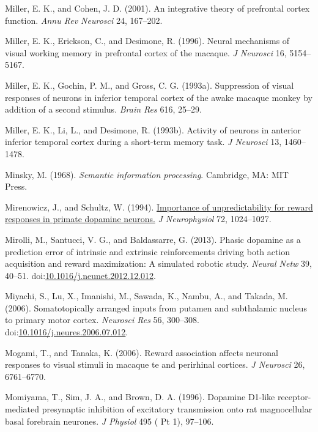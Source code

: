 \documentclass[
  11pt,
  a4paper,
]{scrbook}
\newlength{\cslhangindent}
\newenvironment{CSLReferences}[2] %
 {\begin{list}{}{%
  \setlength{\itemindent}{0pt}
  \setlength{\leftmargin}{0pt}
  \setlength{\parsep}{0pt}
  \ifodd #1
   \setlength{\leftmargin}{\cslhangindent}
   \setlength{\itemindent}{-1\cslhangindent}
  \fi
  \setlength{\itemsep}{#2\baselineskip}}}
 {\end{list}}
\begin{document}
\begin{CSLReferences}{1}{1}
Miller, E. K., and Cohen, J. D. (2001). An integrative theory of
prefrontal cortex function. \emph{Annu Rev Neurosci} 24, 167--202.

Miller, E. K., Erickson, C., and Desimone, R. (1996). Neural mechanisms
of visual working memory in prefrontal cortex of the macaque. \emph{J
Neurosci} 16, 5154--5167.

Miller, E. K., Gochin, P. M., and Gross, C. G. (1993a). Suppression of
visual responses of neurons in inferior temporal cortex of the awake
macaque monkey by addition of a second stimulus. \emph{Brain Res} 616,
25--29.

Miller, E. K., Li, L., and Desimone, R. (1993b). Activity of neurons in
anterior inferior temporal cortex during a short-term memory task.
\emph{J Neurosci} 13, 1460--1478.

Minsky, M. (1968). \emph{Semantic information processing}. Cambridge,
MA: MIT Press.

Mirenowicz, J., and Schultz, W. (1994).
\href{https://www.ncbi.nlm.nih.gov/pubmed/7983508}{Importance of
unpredictability for reward responses in primate dopamine neurons.}
\emph{J Neurophysiol} 72, 1024--1027.

Mirolli, M., Santucci, V. G., and Baldassarre, G. (2013). Phasic
dopamine as a prediction error of intrinsic and extrinsic reinforcements
driving both action acquisition and reward maximization: A simulated
robotic study. \emph{Neural Netw} 39, 40--51.
doi:\href{https://doi.org/10.1016/j.neunet.2012.12.012}{10.1016/j.neunet.2012.12.012}.

Miyachi, S., Lu, X., Imanishi, M., Sawada, K., Nambu, A., and Takada, M.
(2006). Somatotopically arranged inputs from putamen and subthalamic
nucleus to primary motor cortex. \emph{Neurosci Res} 56, 300--308.
doi:\href{https://doi.org/10.1016/j.neures.2006.07.012}{10.1016/j.neures.2006.07.012}.

Mogami, T., and Tanaka, K. (2006). Reward association affects neuronal
responses to visual stimuli in macaque te and perirhinal cortices.
\emph{J Neurosci} 26, 6761--6770.

Momiyama, T., Sim, J. A., and Brown, D. A. (1996). Dopamine {D1}-like
receptor-mediated presynaptic inhibition of excitatory transmission onto
rat magnocellular basal forebrain neurones. \emph{J Physiol} 495 ( Pt
1), 97--106.


\end{CSLReferences}
\end{document}
